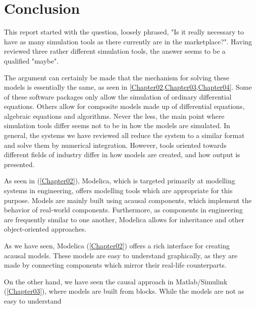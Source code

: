 \documentclass[\rootfolder/main.tex]{subfiles}
\begin{document}
\chapter{Conclusion} %

\label{Chapter06} %

This report started with the question, loosely phrased, "Is it really necessary to have as many simulation tools as there currently are in the marketplace?".
Having reviewed three rather different simulation tools, the answer seems to be a qualified "maybe".

The argument can certainly be made that the mechanism for solving these models is essentially the same, as seen in \cref{Chapter02,Chapter03,Chapter04}.
Some of these software packages only allow the simulation of ordinary differential equations.
Others allow for composite models made up of differential equations, algebraic equations and algorithms.
Never the less, the main point where simulation tools differ seems not to be in how the models are simulated.
In general, the systems we have reviewed all reduce the system to a similar format and solve them by numerical integration.
However, tools oriented towards different fields of industry differ in how models are created, and how output is presented.

As seen in (\cref{Chapter02}), Modelica, which is targeted primarily at modelling systems in engineering, offers modelling tools which are appropriate for this purpose.
Models are mainly built using acausal components, which implement the behavior of real-world components.
Furthermore, as components in engineering are frequently similar to one another, Modelica allows for inheritance and other object-oriented approaches.

As we have seen, Modelica (\cref{Chapter02}) offers a rich interface for creating acausal models.
These models are easy to understand graphically, as they are made by connecting components which mirror their real-life counterparts.

On the other hand, we have seen the causal approach in Matlab/Simulink (\cref{Chapter03}), where models are built from blocks.
While the models are not as easy to understand 
\end{document}
